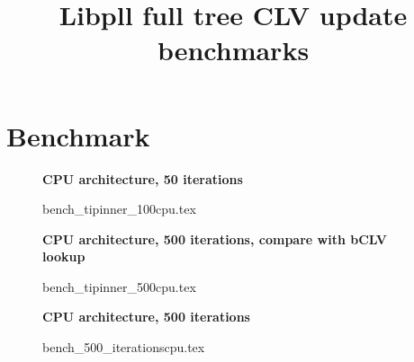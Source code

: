\documentclass[a4paper]{article}
\begin{document}
\newcommand*{\figuretitle}[1]{%
    {\centering%
    \textbf{#1}%
    \par\medskip}%
}


\title{Libpll full tree CLV update benchmarks}
\maketitle



\section{Benchmark}


\begin{figure}[!htb]
\figuretitle{CPU architecture, 50 iterations}
{bench_tipinner_100cpu.tex}
\end{figure}

\begin{figure}[!htb]
\figuretitle{CPU architecture, 500 iterations, compare with bCLV lookup}
{bench_tipinner_500cpu.tex}
\end{figure}
\begin{figure}[!htb]
\figuretitle{CPU architecture, 500 iterations}
{bench_500_iterationscpu.tex}
\end{figure}


\end{document}
